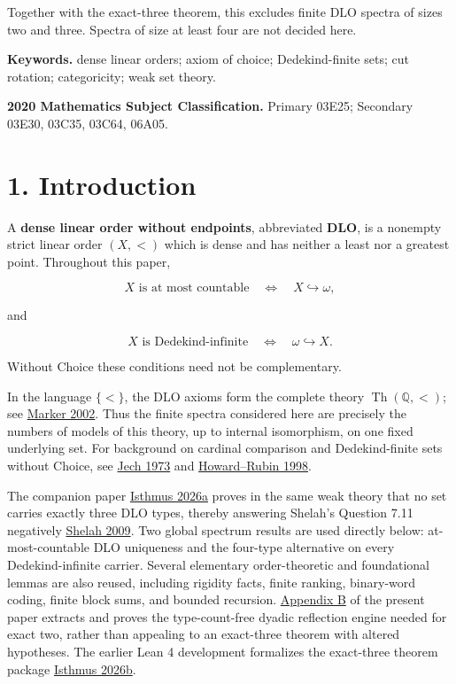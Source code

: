 \documentclass[
  english,
  11pt,
  reqno]{amsart}
\newcounter{none} %
\begin{document}
Together with the exact-three theorem, this excludes finite DLO spectra
of sizes two and three. Spectra of size at least four are not decided
here.

\textbf{Keywords.} dense linear orders; axiom of choice; Dedekind-finite
sets; cut rotation; categoricity; weak set theory.

\textbf{2020 Mathematics Subject Classification.} Primary 03E25;
Secondary 03E30, 03C35, 03C64, 06A05.

\tableofcontents

\protect{}\label{sec:introduction}

\section{1. Introduction}\label{introduction}

A \textbf{dense linear order without endpoints}, abbreviated
\textbf{DLO}, is a nonempty strict linear order \((X,<)\) which is dense
and has neither a least nor a greatest point. Throughout this paper,

\[
X\text{ is at most countable}
\quad\Longleftrightarrow\quad
X\hookrightarrow\omega,
\]

and

\[
X\text{ is Dedekind-infinite}
\quad\Longleftrightarrow\quad
\omega\hookrightarrow X.
\]

Without Choice these conditions need not be complementary.

In the language \(\{<\}\), the DLO axioms form the complete theory
\(\operatorname{Th}(\mathbb Q,<)\); see \hyperref[ref:marker2002]{Marker
2002}. Thus the finite spectra considered here are precisely the numbers
of models of this theory, up to internal isomorphism, on one fixed
underlying set. For background on cardinal comparison and
Dedekind-finite sets without Choice, see \hyperref[ref:jech1973]{Jech
1973} and \hyperref[ref:howardrubin1998]{Howard--Rubin 1998}.

The companion paper \hyperref[ref:isthmus2026a]{Isthmus 2026a} proves in
the same weak theory that no set carries exactly three DLO types,
thereby answering Shelah's Question 7.11 negatively
\hyperref[ref:shelah2009]{Shelah 2009}. Two global spectrum results are
used directly below: at-most-countable DLO uniqueness and the four-type
alternative on every Dedekind-infinite carrier. Several elementary
order-theoretic and foundational lemmas are also reused, including
rigidity facts, finite ranking, binary-word coding, finite block sums,
and bounded recursion. \hyperref[app:dyadic-engine]{Appendix B} of the
present paper extracts and proves the type-count-free dyadic reflection
engine needed for exact two, rather than appealing to an exact-three
theorem with altered hypotheses. The earlier Lean 4 development
formalizes the exact-three theorem package
\hyperref[ref:isthmus2026b]{Isthmus 2026b}.
\end{document}
